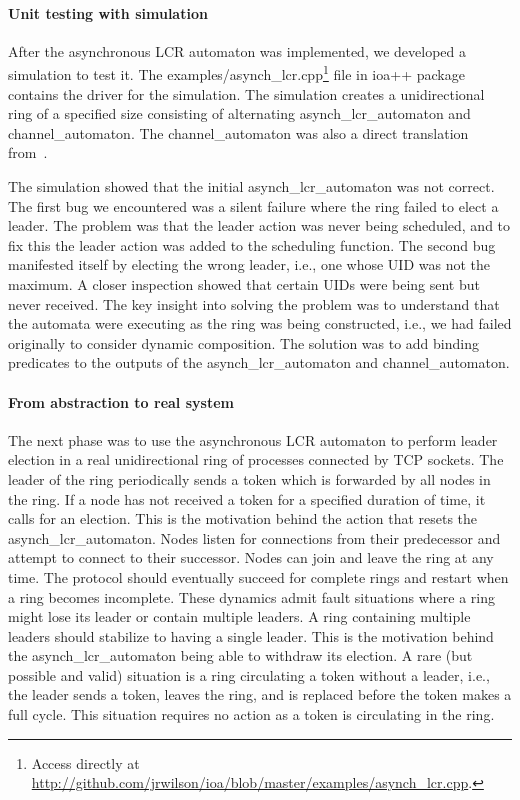 \paragraph*{Unit testing with simulation}
After the asynchronous LCR automaton was implemented, we developed a simulation to test it.
The examples/asynch\_lcr.cpp\footnote{Access directly at \url{http://github.com/jrwilson/ioa/blob/master/examples/asynch_lcr.cpp}.} file in ioa++ package contains the driver for the simulation.
The simulation creates a unidirectional ring of a specified size consisting of alternating asynch\_lcr\_automaton and channel\_automaton.
The channel\_automaton was also a direct translation from~\cite{lynch1996distributed}.

The simulation showed that the initial asynch\_lcr\_automaton was not correct.
The first bug we encountered was a silent failure where the ring failed to elect a leader.
The problem was that the leader action was never being scheduled, and to fix this the leader action was added to the scheduling function.
The second bug manifested itself by electing the wrong leader, i.e., one whose UID was not the maximum.
A closer inspection showed that certain UIDs were being sent but never received.
The key insight into solving the problem was to understand that the automata were executing as the ring was being constructed, i.e., we had failed originally to consider dynamic composition.
The solution was to add binding predicates to the outputs of the asynch\_lcr\_automaton and channel\_automaton.

\paragraph*{From abstraction to real system}
The next phase was to use the asynchronous LCR automaton to perform leader election in a real unidirectional ring of processes connected by TCP sockets.
The leader of the ring periodically sends a token which is forwarded by all nodes in the ring.
If a node has not received a token for a specified duration of time, it calls for an election.
This is the motivation behind the action that resets the asynch\_lcr\_automaton.
Nodes listen for connections from their predecessor and attempt to connect to their successor.
Nodes can join and leave the ring at any time.
The protocol should eventually succeed for complete rings and restart when a ring becomes incomplete.
These dynamics admit fault situations where a ring might lose its leader or contain multiple leaders.
A ring containing multiple leaders should stabilize to having a single leader.
This is the motivation behind the asynch\_lcr\_automaton being able to withdraw its election.
A rare (but possible and valid) situation is a ring circulating a token without a leader, i.e., the leader sends a token, leaves the ring, and is replaced before the token makes a full cycle.
This situation requires no action as a token is circulating in the ring.

